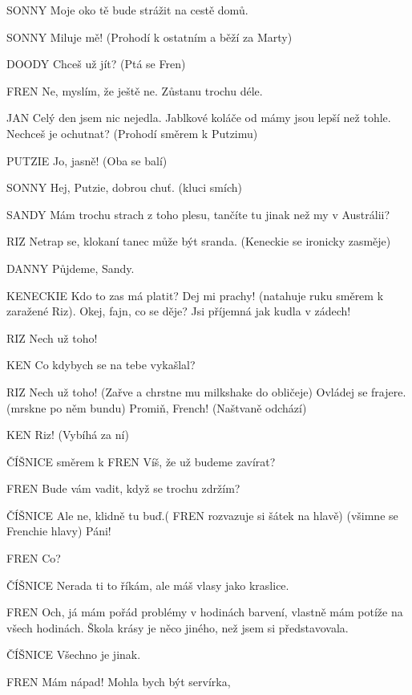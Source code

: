 SONNY        Moje oko tě bude strážit na cestě domů. 

SONNY        Miluje mě! (Prohodí k ostatním a běží za Marty) 

DOODY        Chceš už jít? (Ptá se Fren)

FREN        Ne, myslím, že ještě ne. Zůstanu trochu déle. 

JAN        Celý den jsem nic nejedla. Jablkové koláče od mámy jsou lepší než                 tohle. Nechceš je ochutnat? (Prohodí směrem k Putzimu) 

PUTZIE         Jo, jasně! (Oba se balí) 

SONNY        Hej, Putzie, dobrou chuť. (kluci smích)

SANDY        Mám trochu strach z toho plesu, tančíte tu jinak než my v Austrálii? 

RIZ                Netrap se, klokaní tanec může být sranda. (Keneckie se ironicky                 zasměje) 

DANNY        Půjdeme, Sandy. 

KENECKIE        Kdo to zas má platit? Dej mi prachy! (natahuje ruku směrem k zaražené         Riz). Okej, fajn, co se děje? Jsi příjemná jak kudla v zádech! 

RIZ                Nech už toho! 

KEN        Co kdybych se na tebe vykašlal? 

RIZ                Nech už toho! (Zařve a chrstne mu milkshake do obličeje) Ovládej se         frajere. (mrskne po něm bundu) Promiň, French! (Naštvaně odchází)

KEN         Riz! (Vybíhá za ní) 

ČÍŠNICE          směrem k FREN  Víš, že už budeme zavírat? 

FREN        Bude vám vadit, když se trochu zdržím?

ČÍŠNICE         Ale ne, klidně tu buď.( FREN rozvazuje si šátek na hlavě) (všimne se         Frenchie hlavy) Páni! 

FREN        Co? 

ČÍŠNICE        Nerada ti to říkám, ale máš vlasy jako kraslice. 

FREN        Och, já mám pořád problémy v hodinách barvení, vlastně mám potíže         na všech hodinách. Škola krásy je něco jiného, než jsem si                         představovala. 

ČÍŠNICE         Všechno je jinak.

FREN        Mám nápad! Mohla bych být servírka,

